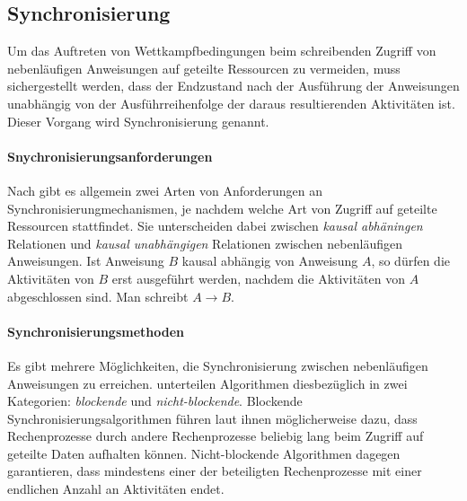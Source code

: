 \subsection{Synchronisierung}
Um das Auftreten von Wettkampfbedingungen beim schreibenden Zugriff von nebenläufigen Anweisungen auf geteilte Ressourcen zu vermeiden, muss sichergestellt werden, dass der Endzustand nach der Ausführung der Anweisungen unabhängig von der Ausführreihenfolge der daraus resultierenden Aktivitäten ist. Dieser Vorgang wird Synchronisierung genannt.

\paragraph{Snychronisierungsanforderungen} Nach \textcite{Herrtwich1989} gibt es allgemein zwei Arten von Anforderungen an Synchronisierungmechanismen, je nachdem welche Art von Zugriff auf geteilte Ressourcen stattfindet. Sie unterscheiden dabei zwischen \emph{kausal abhäningen} Relationen und \emph{kausal unabhängigen} Relationen zwischen nebenläufigen Anweisungen. Ist Anweisung $B$ kausal abhängig von Anweisung $A$, so dürfen die Aktivitäten von $B$ erst ausgeführt werden, nachdem die Aktivitäten von $A$ abgeschlossen sind. Man schreibt $ A \to B$. 

\paragraph{Synchronisierungsmethoden} Es gibt mehrere Möglichkeiten, die Synchronisierung zwischen nebenläufigen Anweisungen zu erreichen. \textcite{Michael1996} unterteilen Algorithmen diesbezüglich in zwei Kategorien: \emph{blockende} und \emph{nicht-blockende}. Blockende Synchronisierungsalgorithmen führen laut ihnen möglicherweise dazu, dass Rechenprozesse durch andere Rechenprozesse beliebig lang beim Zugriff auf geteilte Daten aufhalten können. Nicht-blockende Algorithmen dagegen garantieren, dass mindestens einer der beteiligten Rechenprozesse mit einer endlichen Anzahl an Aktivitäten endet.

